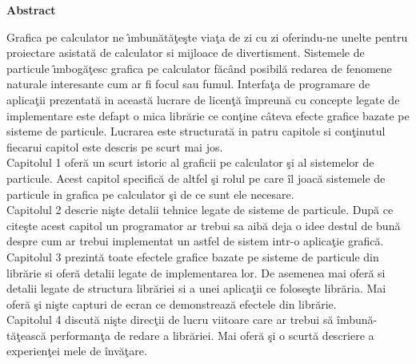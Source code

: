 \thispagestyle{plain}

\begin{center}
	\textbf{Abstract}
\end{center}

Grafica pe calculator ne \^ \i mbun\u{a}t\u{a}\c{t}e\c{s}te via\c{t}a de zi cu zi oferindu-ne unelte pentru proiectare asistată de calculator si mijloace de divertisment. Sistemele de particule \^ \i mbog\u{a}\c{t}esc grafica pe calculator f\u{a}c\^{a}nd posibil\u{a} redarea de fenomene naturale interesante cum ar fi focul sau fumul. Interfa\c{t}a de programare de aplica\c{t}ii prezentat\u{a} in aceast\u{a} lucrare de licen\c{t}\u{a} \^{i}mpreun\u{a} cu concepte legate de implementare este defapt o mica libr\u{a}rie ce con\c{t}ine c\^{a}teva efecte grafice bazate pe sisteme de particule. Lucrarea este structurat\u{a} in patru capitole si con\c{t}inutul fiecarui capitol este descris pe scurt mai jos.\\

Capitolul 1 ofer\u{a} un scurt istoric al graficii pe calculator \c{s}i al sistemelor de particule. Acest capitol specific\u{a} de altfel \c{s}i rolul pe care \^{i}l joac\u{a} sistemele de particule in grafica pe calculator \c{s}i de ce sunt ele necesare.\\

Capitolul 2 descrie ni\c{s}te detalii tehnice legate de sisteme de particule. Dup\u{a} ce cite\c{s}te acest capitol un programator ar trebui sa aib\u{a} deja o idee destul de bun\u{a} despre cum ar trebui implementat un astfel de sistem intr-o aplica\c{t}ie grafic\u{a}.\\

Capitolul 3 prezint\u{a} toate efectele grafice bazate pe sisteme de particule din libr\u{a}rie si ofer\u{a} detalii legate de implementarea lor. De asemenea mai ofer\u{a} si detalii legate de structura libr\u{a}riei si a unei aplica\c{t}ii ce folose\c{s}te libr\u{a}ria. Mai ofer\u{a} \c{s}i ni\c{s}te capturi de ecran ce demonstreaz\u{a} efectele din libr\u{a}rie.\\

Capitolul 4 discut\u{a} ni\c{s}te direc\c{t}ii de lucru viitoare care ar trebui s\u{a} \^{i}mbun\u{a}-t\u{a}\c{t}easc\u{a} performan\c{t}a de redare a libr\u{a}riei. Mai ofer\u{a} \c{s}i o scurt\u{a} descriere a experien\c{t}ei mele de \^{i}nv\u{a}\c{t}are.